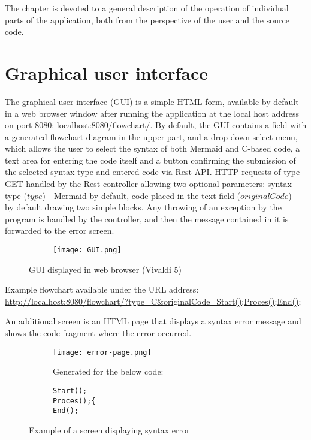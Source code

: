 The chapter is devoted to a general description of the operation of individual parts of the application, both from the perspective of the user and the source code.

\section{Graphical user interface}
  The graphical user interface (GUI) is a simple HTML form, available by default in a web browser window after running the application at the local host address on port 8080: 
	\smallbreak
	\href{http://localhost:8080/flowchart/}{localhost:8080/flowchart/}.
	\bigbreak	
  By default, the GUI contains a field with a generated flowchart diagram in the upper part, and a drop-down select menu, which allows the user to select the syntax of both Mermaid and C-based code, a text area for entering the code itself and a button confirming the submission of the selected syntax type and entered code via Rest API. HTTP requests of type GET handled by the Rest controller allowing two optional parameters: syntax type ($type$) - Mermaid by default, code placed in the text field ($originalCode$) - by default drawing two simple blocks. Any throwing of an exception by the program is handled by the controller, and then the message contained in it is forwarded to the error screen.
	
\begin{figure}[H]
  \begin{subfigure}{\textwidth}
    \centering
    \texttt{[image: GUI.png]}
  \end{subfigure}\hfill
  \caption{GUI displayed in web browser (Vivaldi 5)}
\end{figure}

Example flowchart available under the URL address: 
	\smallbreak
	\href{http://localhost:8080/flowchart/?type=C\&originalCode=Start();Proces();End();}{http://localhost:8080/flowchart/?type=C\&originalCode=Start();Proces();End();}
	\bigbreak
	
  An additional screen is an HTML page that displays a syntax error message and shows the code fragment where the error occurred.
	
\begin{figure}[H]
  \begin{subfigure}{\textwidth}
  \centering
    \texttt{[image: error-page.png]}
  \end{subfigure}\hfill
    \begin{subfigure}[t]{0.44\textwidth}
    \bigbreak
    Generated for the below code:
    \centering
    \begin{verbatim}    
Start();
Proces();{
End();
    \end{verbatim}
  \end{subfigure}%
  \caption{Example of a screen displaying syntax error}
\end{figure}


